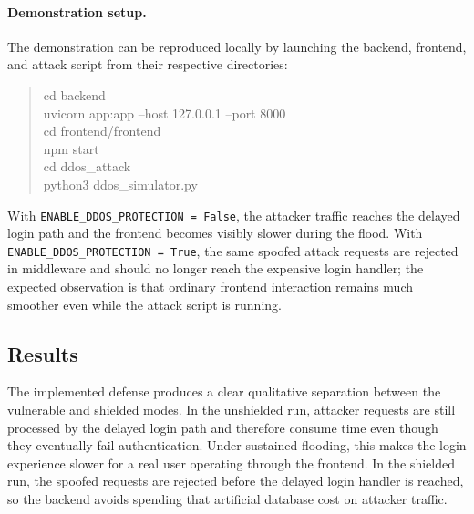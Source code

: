 \documentclass[11pt,a4paper]{article}
\begin{document}
\paragraph{Demonstration setup.}
The demonstration can be reproduced locally by launching the backend, frontend, and attack script from their respective directories:
\begin{quote}
\small\ttfamily
cd backend \\
uvicorn app:app --host 127.0.0.1 --port 8000 \\[0.3em]
cd frontend/frontend \\
npm start \\[0.3em]
cd ddos\_attack \\
python3 ddos\_simulator.py
\end{quote}
With \texttt{ENABLE\_DDOS\_PROTECTION = False}, the attacker traffic reaches the delayed login path and the frontend becomes visibly slower during the flood. With \texttt{ENABLE\_DDOS\_PROTECTION = True}, the same spoofed attack requests are rejected in middleware and should no longer reach the expensive login handler; the expected observation is that ordinary frontend interaction remains much smoother even while the attack script is running.

\subsection{Results}

The implemented defense produces a clear qualitative separation between the vulnerable and shielded modes. In the unshielded run, attacker requests are still processed by the delayed login path and therefore consume time even though they eventually fail authentication. Under sustained flooding, this makes the login experience slower for a real user operating through the frontend. In the shielded run, the spoofed requests are rejected before the delayed login handler is reached, so the backend avoids spending that artificial database cost on attacker traffic.
\end{document}
